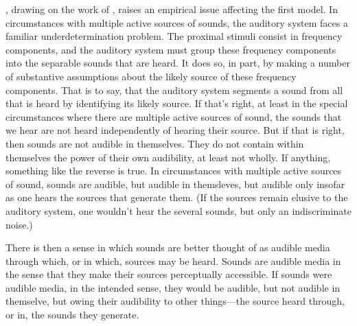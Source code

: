 \documentclass[12pt]{article}
\begin{document}
\citet{Nudds:2009sf}, drawing on the work of \citet[chapter 4]{Bregman:1990aa}, raises an empirical issue affecting the first model. In circumstances with multiple active sources of sounds, the auditory system faces a familiar underdetermination problem. The proximal stimuli consist in frequency components, and the auditory system must group these frequency components into the separable sounds that are heard. It does so, in part, by making a number of substantive assumptions about the likely source of these frequency components. That is to say, that the auditory system segments a sound from all that is heard by identifying its likely source. If that's right, at least in the special circumstances where there are multiple active sources of sound, the sounds that we hear are not heard independently of hearing their source. But if that is right, then sounds are not audible in themselves. They do not contain within themselves the power of their own audibility, at least not wholly. If anything, something like the reverse is true. In circumstances with multiple active sources of sound, sounds are audible, but audible in themsleves, but audible only insofar as one hears the sources that generate them. (If the sources remain elusive to the auditory system, one wouldn't hear the several sounds, but only an indiscriminate noise.) 

There is then a sense in which sounds are better thought of as audible media through which, or in which, sources may be heard. Sounds are audible media in the sense that they make their sources perceptually accessible. If sounds were audible media, in the intended sense, they would be audible, but not audible in themselve, but owing their audibility to other things---the source heard through, or in, the sounds they generate.
\end{document}
